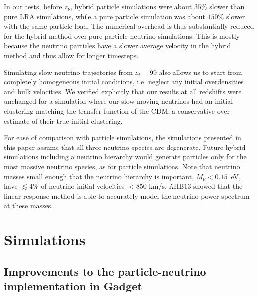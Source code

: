 \documentclass[useAMS, usenatbib]{mnras}
\begin{document}
In our tests, before $z_\nu$, hybrid particle simulations were about $35\%$ slower than pure LRA simulations, while a pure particle simulation was about $150\%$ slower with the same particle load.
The numerical overhead is thus substantially reduced for the hybrid method over pure particle neutrino simulations. This is mostly because the neutrino particles have a slower average velocity in the hybrid method and thus allow for longer timesteps.

Simulating slow neutrino trajectories from $z_i = 99$ also allows us to start from completely homogeneous initial conditions, i.e. neglect any initial overdensities and bulk velocities. We verified explicitly that our results at all redshifts were unchanged for a simulation where our slow-moving neutrinos had an initial clustering matching the transfer function of the CDM, a conservative over-estimate of their true initial clustering.

For ease of comparison with particle simulations, the simulations presented in this paper assume that all three neutrino species are degenerate. Future hybrid simulations including a neutrino hierarchy would generate particles only for the most massive neutrino species, as for particle simulations. Note that neutrino masses small enough that the neutrino hierarchy is important, $M_\nu < 0.15$~eV, have $\lesssim 4$\% of neutrino initial velocities $< 850$ km/s. AHB13 showed that the linear response method is able to accurately model the neutrino power spectrum at these masses.



\section{Simulations} \label{sec:simulations}


\subsection{Improvements to the particle-neutrino implementation in Gadget}
\end{document}
